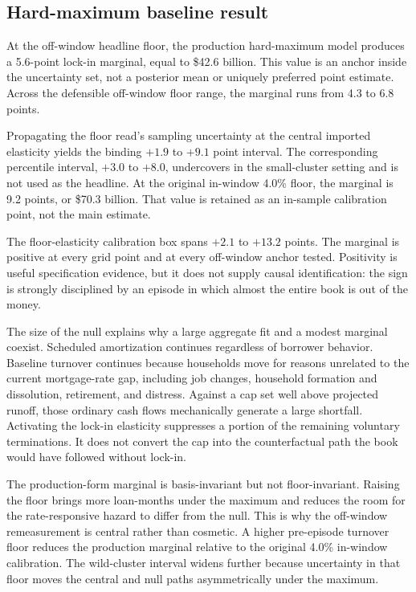 \subsection{Hard-maximum baseline result}

At the off-window headline floor, the production hard-maximum model produces a 5.6-point lock-in marginal, equal to \$42.6 billion. This value is an anchor inside the uncertainty set, not a posterior mean or uniquely preferred point estimate. Across the defensible off-window floor range, the marginal runs from 4.3 to 6.8 points.

Propagating the floor read's sampling uncertainty at the central imported elasticity yields the binding $+1.9$ to $+9.1$ point interval. The corresponding percentile interval, $+3.0$ to $+8.0$, undercovers in the small-cluster setting and is not used as the headline. At the original in-window 4.0\% floor, the marginal is 9.2 points, or \$70.3 billion. That value is retained as an in-sample calibration point, not the main estimate.

The floor-elasticity calibration box spans $+2.1$ to $+13.2$ points. The marginal is positive at every grid point and at every off-window anchor tested. Positivity is useful specification evidence, but it does not supply causal identification: the sign is strongly disciplined by an episode in which almost the entire book is out of the money.

The size of the null explains why a large aggregate fit and a modest marginal coexist. Scheduled amortization continues regardless of borrower behavior. Baseline turnover continues because households move for reasons unrelated to the current mortgage-rate gap, including job changes, household formation and dissolution, retirement, and distress. Against a cap set well above projected runoff, those ordinary cash flows mechanically generate a large shortfall. Activating the lock-in elasticity suppresses a portion of the remaining voluntary terminations. It does not convert the cap into the counterfactual path the book would have followed without lock-in.

The production-form marginal is basis-invariant but not floor-invariant. Raising the floor brings more loan-months under the maximum and reduces the room for the rate-responsive hazard to differ from the null. This is why the off-window remeasurement is central rather than cosmetic. A higher pre-episode turnover floor reduces the production marginal relative to the original 4.0\% in-window calibration. The wild-cluster interval widens further because uncertainty in that floor moves the central and null paths asymmetrically under the maximum.

